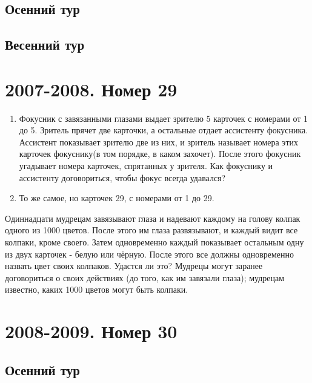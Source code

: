 \documentclass[11pt, a4paper]{common/document_template}
\begin{document}
\section{Осенний тур}



\section{Весенний тур}

\chapter{2007-2008. Номер 29}

\begin{exercise}
\begin{enumerate}
\item Фокусник с завязанными глазами выдает зрителю 5 карточек с номерами от 1 до 5. Зритель прячет две карточки, а остальные отдает ассистенту фокусника. Ассистент показывает зрителю две из них, и зритель называет номера этих карточек фокуснику(в том порядке, в каком захочет). После этого фокусник угадывает номера карточек, спрятанных у зрителя. Как фокуснику и ассистенту договориться, чтобы фокус всегда удавался?
\item  То же самое, но карточек 29, с номерами от 1 до 29.
\end{enumerate}
\end{exercise}

\begin{exercise}
Одиннадцати мудрецам завязывают глаза и надевают каждому на голову колпак одного из 1000 цветов. После этого им глаза развязывают, и каждый видит все колпаки, кроме своего. Затем одновременно каждый показывает остальным одну из двух карточек - белую или чёрную. После этого все должны одновременно назвать цвет своих колпаков. Удастся ли это? Мудрецы могут заранее договориться о своих действиях (до того, как им завязали глаза); мудрецам известно, каких 1000 цветов могут быть колпаки. 
\end{exercise}


\chapter{2008-2009. Номер 30}

\section{Осенний тур}
\end{document}
